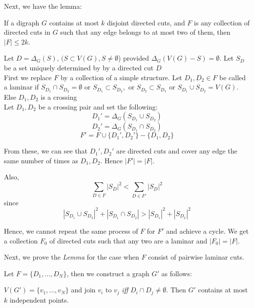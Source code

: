 \documentclass[8pt]{beamer}
\begin{document}
\begin{frame}

Next, we have the lemma:\\
\begin{ly_lemma}[]
If a digraph $G$ contains at most $k$ disjoint directed cuts, and $F$ is any collection of directed cuts in $G$ such that any edge belongs to at most two of them, then $|F| \le 2k$. 
\end{ly_lemma}

Let $D=\Delta_G(S)$, $(S\subset V(G), S\ne \emptyset$) provided $\Delta_G(V(G)-S)=\emptyset$. Let $S_D$ be a set uniquely determined by by a directed cut $D$\\

First we replace $F$ by a collection of a simple structure. Let $D_1, D_2 \in F$ be called a laminar if $S_{D_1}\cap S_{D_2}=\emptyset \text{ or } S_{D_1}\subset S_{D_2}, \text{ or } S_{D_2}\subset S_{D_1} \text{ or } S_{D_1}\cup S_{D_2} = V(G)$. Else $D_1, D_2$ is a crossing\\

Let $D_1, D_2$ be a crossing pair and set the following:
$$D_1'=\Delta_G(S_{D_1} \cup S_{D_2})$$
$$D_2'=\Delta_G(S_{D_1} \cap S_{D_2})$$
$$F'=F\cup \{D_1',D_2' \}-\{D_1,D_2 \}$$

From these, we can see that $D_1', D_2'$ are directed cuts and cover any edge the same number of times as $D_1, D_2$. Hence $|F'| = |F|$. 

\end{frame}

\begin{frame}

Also,
$$\underset{D\in F}{\sum}|S_D|^2 < \underset{D\in F'}{\sum}|S_D|^2$$
since 
$$|S_{D_1}\cup S_{D_2}|^2 + |S_{D_1}\cap S_{D_2}|>|S_{D_1}|^2+|S_{D_2}|^2$$

Hence, we cannot repeat the same process of $F$ for $F'$ and achieve a cycle. We get a collection $F_0$ of directed cuts such that any two are a laminar and $|F_0| = |F|$. 

Next, we prove the \textit{Lemma} for the case when $F$ consist of pairwise laminar cuts. 

Let $F=\{D_1,\dots,D_N\}$, then we construct a graph $G'$ as follows:

$V(G')=\{v_1,\dots,v_N\}$ and join $v_i$ to $v_j$ \textit{iff} $D_i \cap D_j \ne \emptyset$. Then $G'$ contains at most $k$ independent points. 

\end{frame}
\end{document}
